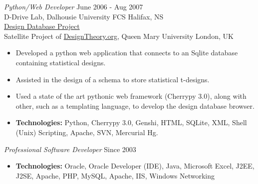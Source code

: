 \documentclass[line,margin]{res}
\begin{document}
\begin{resume}
    {\sl Python/Web Developer} \hfill June 2006 - Aug 2007 \\
    D-Drive Lab, Dalhousie University FCS \hfill Halifax, NS \\
    \href{http://batman.cs.dal.ca/~peter/designdb/}{Design Database Project}\\
    Satellite Project of \href{http://designtheory.org}{DesignTheory.org},
    Queen Mary University \hfill London, UK \smallskip
        \begin{itemize}  \itemsep -2pt %
    \item Developed a python web application that connects to an Sqlite
    database \\ containing statistical designs.
    \item Assisted in the design of a schema to store statistical t-designs.
    \item Used a state of the art pythonic web framework (Cherrypy 3.0),
    along with other, such as a templating language, to develop the design
    database browser.
    \item {\bf Technologies:} \hspace{1pt}
        Python, Cherrypy 3.0, Genshi, HTML, SQLite, XML, \newline
        \hspace*{72pt} Shell (Unix) Scripting, Apache, SVN, Mercurial Hg.
        \end{itemize}

    {\sl Professional Software Developer} \hfill Since 2003 \smallskip
        \begin{itemize}  \itemsep -2pt %
    \item {\bf Technologies:} \hspace{3pt}
        Oracle, Oracle Developer (IDE), Java, Microsoft Excel, \newline
        \hspace*{72pt} J2EE, J2SE, Apache, PHP, MySQL, Apache, IIS, \newline
        \hspace*{72pt} Windows Networking
        \end{itemize}


\end{resume}
\end{document}
